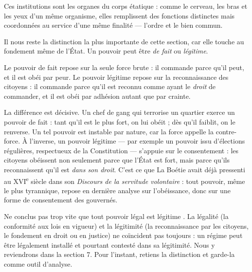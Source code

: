 \documentclass[11pt]{article}
\newcommand{\cle}[1]{{\popxbold\color{popdark}#1}}
\newcounter{popsec}
\newcounter{popsub}
\newcommand{\courssub}[1]{%
  \stepcounter{popsub}%
  \par\vspace{9pt}\noindent{\popxbold\fontsize{11.5}{13}\selectfont\color{popink}{\color{poporange}\thepopsec.\thepopsub}\hspace{6pt}#1}\par\nopagebreak\vspace{4pt}
}
\begin{document}
Ces institutions sont les organes du corps étatique : comme le cerveau, les bras et les yeux d'un même organisme, elles remplissent des fonctions distinctes mais coordonnées au service d'une même finalité — l'ordre et le bien commun.

\courssub{Pouvoir de fait et pouvoir légitime}

Il nous reste la distinction la plus importante de cette section, car elle touche au fondement même de l'État. Un pouvoir peut être \emph{de fait} ou \emph{légitime}.

\begin{definition}
Le \cle{pouvoir de fait} repose sur la seule force brute : il commande parce qu'il peut, et il est obéi par peur. Le \cle{pouvoir légitime} repose sur la reconnaissance des citoyens : il commande parce qu'il est reconnu comme ayant le \emph{droit} de commander, et il est obéi par adhésion autant que par crainte.
\end{definition}

La différence est décisive. Un chef de gang qui terrorise un quartier exerce un pouvoir de fait : tant qu'il est le plus fort, on lui obéit ; dès qu'il faiblit, on le renverse. Un tel pouvoir est instable par nature, car la force appelle la contre-force. À l'inverse, un pouvoir légitime — par exemple un pouvoir issu d'élections régulières, respectueux de la Constitution — s'appuie sur le consentement : les citoyens obéissent non seulement parce que l'État est fort, mais parce qu'ils reconnaissent qu'il est \emph{dans son droit}. C'est ce que La Boétie avait déjà pressenti au XVI\textsuperscript{e} siècle dans son \emph{Discours de la servitude volontaire} : tout pouvoir, même le plus tyrannique, repose en dernière analyse sur l'obéissance, donc sur une forme de consentement des gouvernés.

\begin{attention}
Ne conclus pas trop vite que \guillemotleft tout pouvoir légal est légitime \guillemotright. La légalité (la conformité aux lois en vigueur) et la légitimité (la reconnaissance par les citoyens, le fondement en droit ou en justice) ne coïncident pas toujours : un régime peut être légalement installé et pourtant contesté dans sa légitimité. Nous y reviendrons dans la section 7. Pour l'instant, retiens la distinction et garde-la comme outil d'analyse.
\end{attention}
\end{document}
